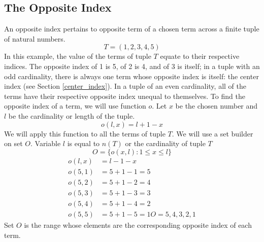 \documentclass[letterpaper, twoside,12pt]{article}
\begin{document}
    \subsection{The Opposite Index}
    An opposite index pertains to opposite term of a chosen term across a finite tuple of natural numbers.
    \begin{equation*}
        T = (1,2,3,4,5)
    \end{equation*}
    In this example, the value of the terms of tuple $T$ equate to their respective indices. The opposite index of 1 is 5, of 2 is 4, and of 3 is itself; in a tuple with an odd cardinality, there is always one term whose opposite index is itself: the center index (see Section \ref{center_index}). In a tuple of an even cardinality, all of the terms have their respective opposite index unequal to themselves. To find the opposite index of a term, we will use function $o$. Let $x$ be the chosen number and $l$ be the cardinality or length of the tuple.
    \begin{equation}
        o(l,x) = l + 1 - x
    \end{equation}
    We will apply this function to all the terms of tuple $T$. We will use a set builder on set $O$. Variable $l$ is equal to $n(T)$ or the cardinality of tuple $T$
    \begin{equation*}
        O = \{ o(x,l) : 1 \leq x \leq l\}
    \end{equation*}
    \begin{equation*}
        \begin{split}
            o(l,x) &= l - 1 - x \\
            o(5,1) &= 5 + 1 - 1 = 5 \\
            o(5,2) &= 5 + 1 - 2 = 4 \\
            o(5,3) &= 5 + 1 - 3 = 3 \\
            o(5,4) &= 5 + 1 - 4 = 2 \\
            o(5,5) &= 5 + 1 - 5 = 1
            O = {5,4,3,2,1}
        \end{split}
    \end{equation*}
    Set $O$ is the range whose elements are the corresponding opposite index of each term.
    
\end{document}
